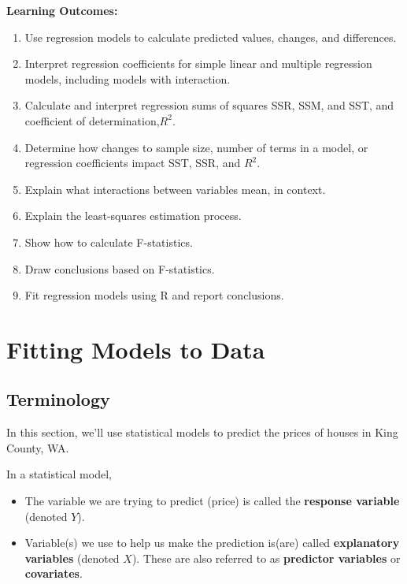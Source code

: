 \documentclass[
  letterpaper,
  DIV=11,
  numbers=noendperiod]{scrreprt}
\providecommand{\tightlist}{%
  \setlength{\itemsep}{0pt}\setlength{\parskip}{0pt}}\usepackage{longtable,booktabs,array}
\begin{document}
\textbf{Learning Outcomes:}

\begin{enumerate}
\def\labelenumi{\arabic{enumi}.}
\setcounter{enumi}{4}
\tightlist
\item
  Use regression models to calculate predicted values, changes, and
  differences.\\
\item
  Interpret regression coefficients for simple linear and multiple
  regression models, including models with interaction.\\
\item
  Calculate and interpret regression sums of squares SSR, SSM, and SST,
  and coefficient of determination,\(R^2\).\\
\item
  Determine how changes to sample size, number of terms in a model, or
  regression coefficients impact SST, SSR, and \(R^2\).\\
\item
  Explain what interactions between variables mean, in context.\\
\item
  Explain the least-squares estimation process.\\
\item
  Show how to calculate F-statistics.\\
\item
  Draw conclusions based on F-statistics.\\
\item
  Fit regression models using R and report conclusions.
\end{enumerate}

\section{Fitting Models to Data}\label{fitting-models-to-data}

\subsection{Terminology}\label{terminology}

In this section, we'll use statistical models to predict the prices of
houses in King County, WA.

In a statistical model,

\begin{itemize}
\item
  The variable we are trying to predict (price) is called the
  \textbf{response variable} (denoted \(Y\)).
\item
  Variable(s) we use to help us make the prediction is(are) called
  \textbf{explanatory variables} (denoted \(X\)). These are also
  referred to as \textbf{predictor variables} or \textbf{covariates}.
\end{itemize}
\end{document}
